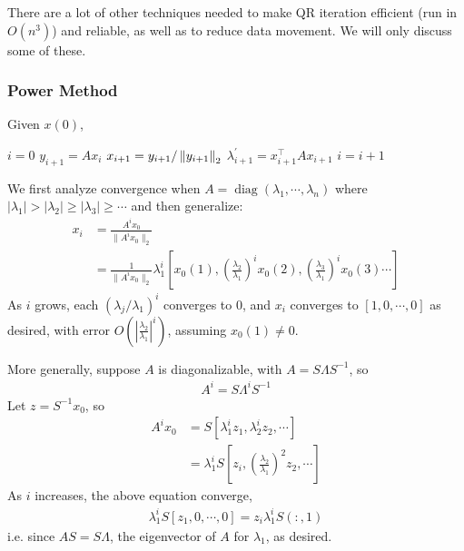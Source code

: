 \documentclass[11pt]{article}
\numberwithin{equation}{section}
\begin{document}
There are a lot of other techniques needed to make QR iteration efficient (run in $O(n^3)$) and reliable, as well as to reduce data movement. 
We will only discuss some of these.

\subsubsection{Power Method}
Given $x(0)$,
\begin{algorithmfrm}
    \begin{algorithmic}[1]
        \State $i = 0$
        \State $y_{i+1} = A x_i$
        \State $x_{i+1} = y_{i+1} / \left\| y_{i+1} \right\|_2$
        \State $\lambda^{\prime}_{i+1} = x_{i+1}^\top A x_{i+1}$
        \State $i = i + 1$
        \EndWhile
    \end{algorithmic}
\end{algorithmfrm}

We first analyze convergence when $A = \operatorname{diag}(\lambda_1,\cdots, \lambda_n)$ where $|\lambda_1| > |\lambda_2| \geq |\lambda_3| \geq \cdots$ 
and then generalize: \begin{align*}
    x_{i} &= \frac{A^{i} {x_{0}}}{\| A^{i} {x_{0}} \|_{2}} \\
    &= \frac{1}{\| A^{i} {x_{0}} \|_{2}}\lambda_{1}^{i}\left[x_{0}(1),\left(\frac{\lambda_{2}}{\lambda_{1}}\right)^{i} x_{0}(2),\left(\frac{\lambda_{3}}{\lambda_{1}}\right)^{i} x_{0}(3) \cdots \right]
\end{align*}
As $i$ grows, each $(\lambda_j/\lambda_1)^i$ converges to 0, and $x_i$ converges to $[1,0,\cdots, 0]$ as desired, 
with error $O(|\frac{\lambda_2}{\lambda_1}|^i)$, assuming $x_0(1) \neq 0$.

More generally, suppose $A$ is diagonalizable, with $A = S \Lambda S^{-1}$, so \begin{align*}
    A^i = S \Lambda^i S^{-1}    
\end{align*}
Let $z = S^{-1}  x_0$, so \begin{align*}
    A^{i} x_{0} &= S\left[\lambda_{1}^{i} z_{1}, \lambda_{2}^{i} z_{2}, \cdots \right] \\
    &= \lambda_{1}^{i} S\left[z_{i},\left(\frac{\lambda_{2}}{\lambda_{1}}\right)^{2} z_{2}, \cdots\right]
\end{align*}
As $i$ increases, the above equation converge, \begin{align*}
    \lambda_{1}^{i} S\left[z_{1}, 0, \cdots ,0 \right] = z_{i} \lambda_{1}^{i} S\left(:, 1\right)
\end{align*}
i.e. since $AS = S\Lambda$, the eigenvector of $A$ for $\lambda_1$, as desired.
\end{document}
